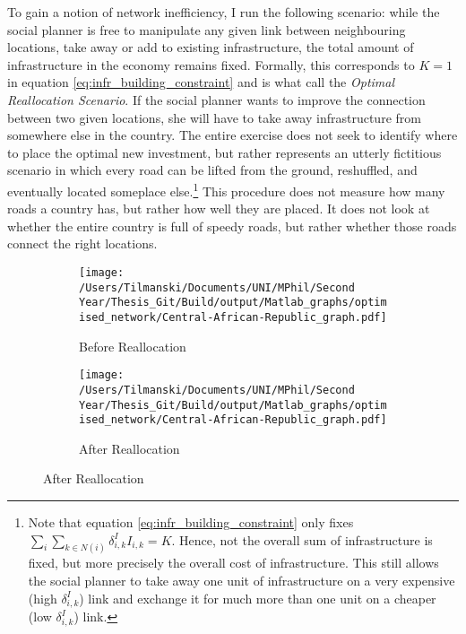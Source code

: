 \documentclass[11pt, oneside]{article}   	%
\begin{document}
To gain a notion of network inefficiency, I run the following scenario: while the social planner is free to manipulate any given link between neighbouring locations, take away or add to existing infrastructure, the total amount of infrastructure in the economy remains fixed. Formally, this corresponds to $K = 1$ in equation \eqref{eq:infr_building_constraint} and is what \citeauthor{fajgelbaum_optimal_2017} call the \textit{Optimal Reallocation Scenario}. If the social planner wants to improve the connection between two given locations, she will have to take away infrastructure from somewhere else in the country. The entire exercise does not seek to identify where to place the optimal new investment, but rather represents an utterly fictitious scenario in which every road can be lifted from the ground, reshuffled, and eventually located someplace else.\footnote{Note that equation \eqref{eq:infr_building_constraint} only fixes $\sum_{i}^{}\sum_{k \in N(i)}^{} \delta_{i,k}^{I}I_{i,k} = K$. Hence, not the overall sum of infrastructure is fixed, but more precisely the overall cost of infrastructure. This still allows the social planner to take away one unit of infrastructure on a very expensive (high $\delta_{i,k}^{I}$) link and exchange it for much more than one unit on a cheaper (low $\delta_{i,k}^{I}$) link.} This procedure does not measure how many roads a country has, but rather how well they are placed. It does not look at whether the entire country is full of speedy roads, but rather whether those roads connect the right locations.

\begin{figure}
\centering
\caption{Optimal Reallocation Scenario in the Central African Republic}

\begin{subfigure}[c]{0.48\textwidth}
\texttt{[image: /Users/Tilmanski/Documents/UNI/MPhil/Second Year/Thesis\_Git/Build/output/Matlab\_graphs/optimised\_network/Central-African-Republic\_graph.pdf]}
\caption{Before Reallocation}
\label{fig:before_restructure}
\end{subfigure}
\begin{subfigure}[c]{0.48\textwidth}
\texttt{[image: /Users/Tilmanski/Documents/UNI/MPhil/Second Year/Thesis\_Git/Build/output/Matlab\_graphs/optimised\_network/Central-African-Republic\_graph.pdf]}
\caption{After Reallocation}
\label{fig:after_restructure}
\end{subfigure}
\label{fig:restructure_centralafricanrepublic}
\end{figure}
\end{document}
